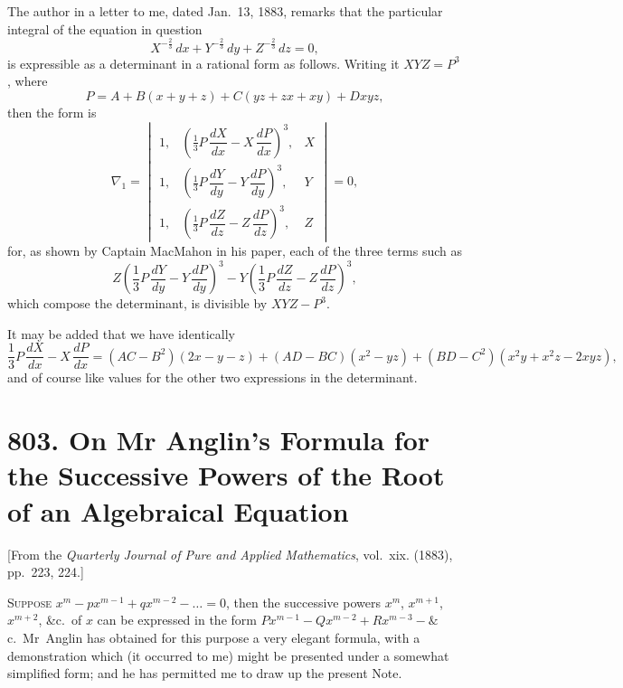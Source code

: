 \documentclass[11pt,a4paper]{article}
\theoremstyle{plain}
\theoremstyle{definition}
\theoremstyle{remark}
\begin{document}
The author in a letter to me, dated Jan.~13, 1883, remarks that the particular integral of the equation in question
\[
X^{-\frac{2}{3}}\,dx + Y^{-\frac{2}{3}}\,dy + Z^{-\frac{2}{3}}\,dz = 0,
\]
is expressible as a determinant in a rational form as follows. Writing it $XYZ = P^3$, where
\[
P = A + B(x+y+z) + C(yz+zx+xy) + Dxyz,
\]
then the form is
\[
\nabla_1 = \begin{vmatrix}
1, & \left(\frac{1}{3}P\,\dfrac{dX}{dx} - X\,\dfrac{dP}{dx}\right)^3, & X \\[1em]
1, & \left(\frac{1}{3}P\,\dfrac{dY}{dy} - Y\,\dfrac{dP}{dy}\right)^3, & Y \\[1em]
1, & \left(\frac{1}{3}P\,\dfrac{dZ}{dz} - Z\,\dfrac{dP}{dz}\right)^3, & Z
\end{vmatrix} = 0,
\]
for, as shown by Captain MacMahon in his paper, each of the three terms such as
\[
Z\left(\frac{1}{3}P\,\frac{dY}{dy} - Y\,\frac{dP}{dy}\right)^3
- Y\left(\frac{1}{3}P\,\frac{dZ}{dz} - Z\,\frac{dP}{dz}\right)^3,
\]
which compose the determinant, is divisible by $XYZ - P^3$.

It may be added that we have identically
\[
\frac{1}{3}P\,\frac{dX}{dx} - X\,\frac{dP}{dx}
= (AC-B^2)(2x-y-z) + (AD-BC)(x^2-yz) + (BD-C^2)(x^2y+x^2z-2xyz),
\]
and of course like values for the other two expressions in the determinant.


\newpage
\section*{803. On Mr Anglin's Formula for the Successive Powers of the Root of an Algebraical Equation}

\begin{center}
\small[From the \textit{Quarterly Journal of Pure and Applied Mathematics}, vol.~xix. (1883),\\
pp.~223, 224.]
\end{center}

\bigskip

\noindent
\textsc{Suppose} $x^m - px^{m-1} + qx^{m-2} - \ldots = 0$, then the successive powers $x^m$, $x^{m+1}$, $x^{m+2}$, \&c.\ of $x$ can be expressed in the form $Px^{m-1} - Qx^{m-2} + Rx^{m-3} - \&$c.\ Mr~Anglin has obtained for this purpose a very elegant formula, with a demonstration which (it occurred to me) might be presented under a somewhat simplified form; and he has permitted me to draw up the present Note.
\end{document}

